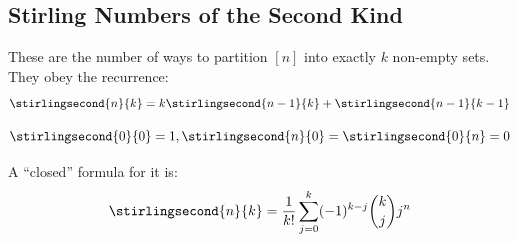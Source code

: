 \subsection{Stirling Numbers of the Second Kind} These are the number of ways to partition $[n]$ into exactly $k$ non-empty sets. They obey the recurrence:
  \begin{equation*}
    \stirlingsecond{n}{k} = k\stirlingsecond{n-1}{k} + \stirlingsecond{n-1}{k-1}
  \end{equation*}

  \begin{equation*}
    \stirlingsecond{0}{0} = 1, \stirlingsecond{n}{0} = \stirlingsecond{0}{n} = 0
  \end{equation*}

  A ``closed'' formula for it is:
  \begin{equation*}
    \stirlingsecond{n}{k} = \frac{1}{k!}\sum_{j=0}^k (-1)^{k-j} \binom{k}{j} j^n
  \end{equation*}
